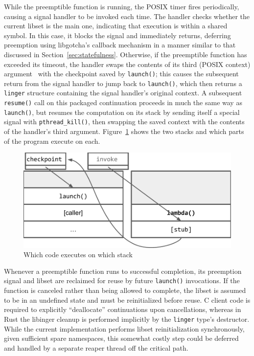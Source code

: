 While the preemptible function is running, the POSIX timer fires periodically,
causing a signal handler to be invoked each time.  The handler checks whether the
current libset is the main one, indicating that execution is within a shared symbol.
In this case, it blocks the signal and immediately
returns, deferring preemption using libgotcha's callback mechanism in a manner
similar to that discussed in Section~\ref{sec:statefulness}.  Otherwise, if the
preemptible function has exceeded its timeout, the handler swaps the contents of its
third (POSIX context) argument~\cite{sigaction-manpage} with the checkpoint saved by
\texttt{launch()}; this causes the subsequent return from the signal handler to jump
back to \texttt{launch()}, which then returns a \texttt{linger} structure containing
the signal handler's original context.  A subsequent \texttt{resume()} call on this
packaged continuation proceeds in much the same way as \texttt{launch()}, but
resumes the computation on its stack by sending itself a special signal with
\texttt{pthread\_kill()}, then swapping the saved context with the contents of the
handler's third argument.  Figure~\ref{fig:twostacks} shows the two stacks and which
parts of the program execute on each.

\begin{figure}
\includegraphics[width=\columnwidth]{figs/twostacks}
\caption{Which code executes on which stack}
\label{fig:twostacks}
\end{figure}

Whenever a preemptible function runs to successful completion, its preemption signal
and libset are reclaimed for reuse by future \texttt{launch()} invocations.  If the
function is canceled rather than being allowed to complete, the libset is assumed to
be in an undefined state and must be reinitialized before reuse.  C client code is
required to explicitly ``deallocate'' continuations upon cancellations, whereas in
Rust the libinger cleanup is performed implicitly by the \texttt{linger} type's
destructor.  While the current implementation performs libset reinitialization
synchronously, given sufficient spare namespaces, this somewhat costly step could be
deferred and handled by a separate reaper thread off the critical path.


